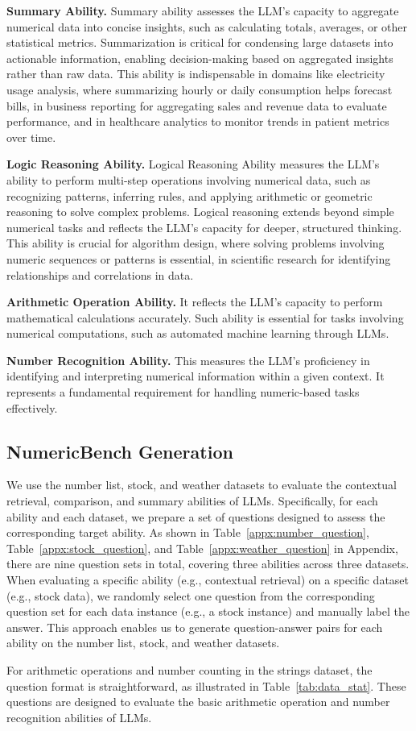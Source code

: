 \noindent\textbf{Summary Ability.}
Summary ability assesses the LLM’s capacity to aggregate numerical data into concise insights, such as calculating totals, averages, or other statistical metrics. 
Summarization is critical for condensing large datasets into actionable information, enabling decision-making based on aggregated insights rather than raw data. 
This ability is indispensable in domains like electricity usage analysis, where summarizing hourly or daily consumption helps forecast bills, in business reporting for aggregating sales and revenue data to evaluate performance, 
and in healthcare analytics to monitor trends in patient metrics over time.



\noindent\textbf{Logic Reasoning Ability.}
Logical Reasoning Ability measures the LLM’s ability to perform multi-step operations involving numerical data, 
such as recognizing patterns, inferring rules, and applying arithmetic or geometric reasoning to solve complex problems. Logical reasoning extends beyond simple numerical tasks and reflects the LLM’s capacity for deeper, structured thinking. 
This ability is crucial for algorithm design, where solving problems involving numeric sequences or patterns is essential, in scientific research for identifying relationships and correlations in data.

\noindent\textbf{Arithmetic Operation Ability.}
It reflects the LLM's capacity to perform mathematical calculations accurately. Such ability is essential for tasks involving numerical computations, such as  automated machine learning through LLMs.





\noindent\textbf{Number Recognition  Ability.}
This measures the LLM's proficiency in identifying and interpreting numerical information within a given context. It represents a fundamental requirement for handling numeric-based tasks effectively.




\subsection{NumericBench Generation}
We use the number list, stock, and weather datasets to evaluate the contextual retrieval, comparison, and summary abilities of LLMs. 
Specifically, for each ability and each dataset, we prepare a set of questions designed to assess the corresponding target ability.
As shown in Table~\ref{appx:number_question}, Table~\ref{appx:stock_question}, and Table~\ref{appx:weather_question} in Appendix, there are nine question sets in total, covering three abilities across three datasets. 
When evaluating a specific ability (e.g., contextual retrieval) on a specific dataset (e.g., stock data), we randomly select one question from the corresponding question set for each data instance (e.g., a stock instance) 
and manually label the answer. This approach enables us to generate question-answer pairs for each ability on the number list, stock, and weather datasets.

For arithmetic operations and number counting in the strings dataset, the question format is straightforward, as illustrated in Table~\ref{tab:data_stat}. These questions are designed to evaluate the basic arithmetic operation and number recognition abilities of LLMs.


